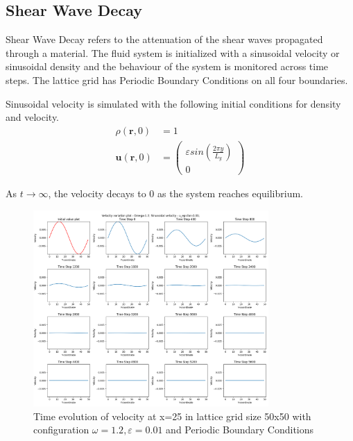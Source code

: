 \documentclass[a4paper,11pt]{report}
\begin{document}
\subsection{Shear Wave Decay}
Shear Wave Decay refers to the attenuation of the shear waves propagated through a material. The fluid system is initialized with a sinusoidal velocity or sinusoidal density and the behaviour of the system is monitored across time steps. The lattice grid has Periodic Boundary Conditions on all four boundaries.

Sinusoidal velocity is simulated with the following initial conditions for density and velocity.
\begin{equation}
    \begin{aligned}
        \rho \left( \mathbf{r}, 0 \right) &= 1\\
        \mathbf{u} \left( \mathbf{r}, 0 \right) &= \begin{pmatrix} {\varepsilon sin\left( \frac{2 \pi y} {L_y}\right) } \\ 0 \end{pmatrix} 
    \end{aligned}
\end{equation}

As $t \rightarrow  \infty $, the velocity decays to 0 as the system reaches equilibrium. 

\begin{figure}[h!]
  \begin{center}
   \includegraphics[width=0.8\textwidth]{HPC_report/images/shear_wave_decay/sinusoidal_velocity/Decay-Y-coordinate-Velocity.png}
   \caption{Time evolution of velocity at x=25 in lattice grid size 50x50 with configuration $\omega = 1.2, \varepsilon = 0.01$ and Periodic Boundary Conditions}
  \label{fig:swd_sv_ind}
  \end{center}
\end{figure} 
\end{document}
